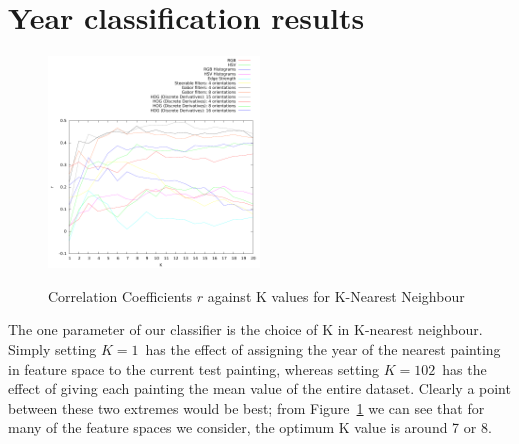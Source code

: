 \documentclass[conference,a4paper]{IEEEtran}
\begin{document}


\section{Year classification results}
\label{results}

\begin{figure}[h]
\centering
\includegraphics[width=0.5\textwidth]{results/mean.pdf}
\label{pearsons-k}
\caption{Correlation Coefficients $r$ against K values for K-Nearest Neighbour}
\end{figure}


The one parameter of our classifier is the choice of K in K-nearest neighbour.
Simply setting $K=1$\ has the effect of assigning the year of the nearest
painting in feature space to the current test painting, whereas setting
$K=102$\ has the effect of giving each painting the mean value of the entire
dataset. Clearly a point between these two extremes would be best; from
Figure~\ref{pearsons-k} we can see that for many of the feature spaces we
consider, the optimum K value is around 7 or 8.

\end{document}
